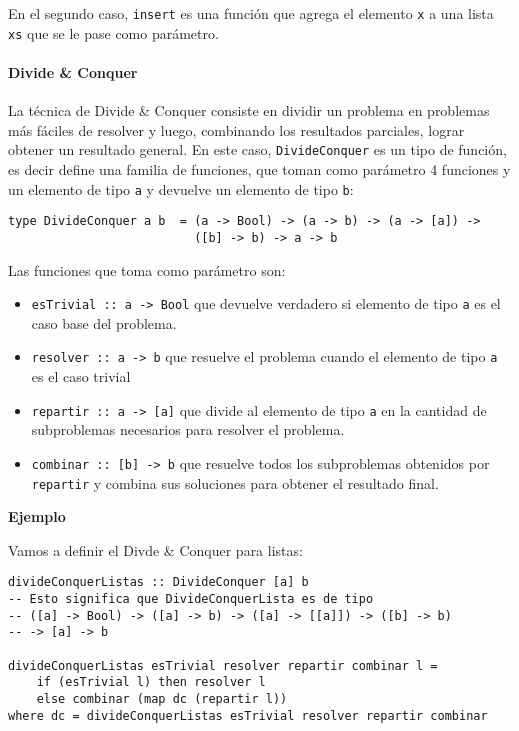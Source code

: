 En el segundo caso, \texttt{insert} es una función que agrega el elemento \texttt{x} a una lista \texttt{xs} que se le pase como parámetro.

\paragraph{Divide \& Conquer}
La técnica de Divide \& Conquer consiste en dividir un problema en problemas más fáciles de resolver y luego, combinando los resultados parciales, lograr
obtener un resultado general. En este caso, \texttt{DivideConquer} es un tipo de función, es decir define una familia de funciones, que toman como parámetro 4 funciones y un elemento de tipo \texttt{a} y devuelve un elemento de tipo \texttt{b}:
\begin{centrado}
	\begin{verbatim}
type DivideConquer a b  = (a -> Bool) -> (a -> b) -> (a -> [a]) -> 
                          ([b] -> b) -> a -> b                         
\end{verbatim}
\end{centrado}
Las funciones que toma como parámetro son:
\begin{itemize}
	\item \texttt{esTrivial :: a -> Bool} que devuelve verdadero si elemento de tipo \texttt{a} es el caso base del problema.
	\item \texttt{resolver :: a -> b} que resuelve el problema cuando el elemento de tipo \texttt{a} es el caso trivial
	\item \texttt{repartir :: a -> [a]} que divide al elemento de tipo \texttt{a} en la cantidad de subproblemas necesarios para resolver el problema.
	\item \texttt{combinar :: [b] -> b} que resuelve todos los subproblemas obtenidos por \texttt{repartir} y combina sus soluciones para obtener el resultado final.
\end{itemize}

\textbf{Ejemplo}

Vamos a definir el Divde \& Conquer para listas:
\begin{centrado}
	\begin{verbatim}
divideConquerListas :: DivideConquer [a] b
-- Esto significa que DivideConquerLista es de tipo 
-- ([a] -> Bool) -> ([a] -> b) -> ([a] -> [[a]]) -> ([b] -> b)
-- -> [a] -> b

divideConquerListas esTrivial resolver repartir combinar l =
	if (esTrivial l) then resolver l
	else combinar (map dc (repartir l))
where dc = divideConquerListas esTrivial resolver repartir combinar
                        
	\end{verbatim}
\end{centrado}


